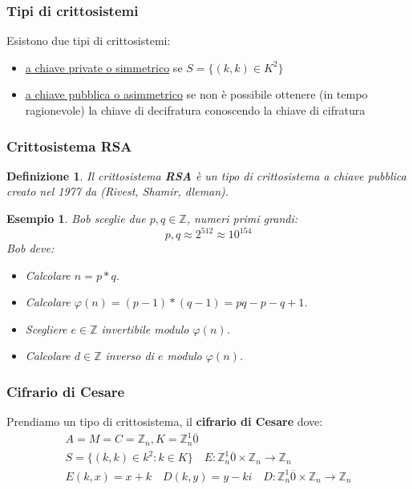 \documentclass{article}
\newtheorem{exmp}{Esempio}[section]
\newtheorem{definition}{Definizione}[section]
\begin{document}
\subsubsection{Tipi di crittosistemi}
Esistono due tipi di crittosistemi:
\begin{itemize}
        \item \underline{a chiave private o simmetrico} se $S = \{(k,k) \in K^2\}$
        \item \underline{a chiave pubblica o asimmetrico} se non è possibile ottenere (in tempo ragionevole) la chiave di decifratura conoscendo la chiave di cifratura
\end{itemize}

\subsubsection{Crittosistema RSA}
\begin{definition}
        Il crittosistema \textbf{RSA} è un tipo di crittosistema a chiave pubblica creato nel 1977 da (Rivest, Shamir, dleman).
\end{definition}

\begin{exmp}
      Bob sceglie due $p,q \in \mathbb{Z}$, numeri primi grandi:
      \begin{equation*}
              p,q \approx 2^{512} \approx 10^{154}
      \end{equation*}
      Bob deve:
      \begin{itemize}
              \item Calcolare $n = p * q$.
              \item Calcolare $\varphi(n) = (p-1) * (q-1) = pq - p - q + 1$.
              \item Scegliere $e \in \mathbb{Z}$ invertibile modulo $\varphi(n)$.
              \item Calcolare $d \in \mathbb{Z}$ inverso di $e$ modulo $\varphi(n)$.
      \end{itemize}
\end{exmp}


\subsubsection{Cifrario di Cesare}
Prendiamo un tipo di crittosistema, il \textbf{cifrario di Cesare} dove:
\begin{align*}
        A = M = C = \mathbb{Z}_n, K=\mathbb{Z}_n^1{\overline{0}} \\
        S = \{(k,k) \in k^2 : k \in K\} \quad E : \mathbb{Z}_n^1{\overline{0} \times \mathbb{Z}_n \to \mathbb{Z}_n}\\
        E(k,x) = x + k \quad D(k,y) = y - ki \quad D:\mathbb{Z}_n^1{\overline{0}} \times \mathbb{Z}_n \to \mathbb{Z}_n       
\end{align*}
\end{document}
